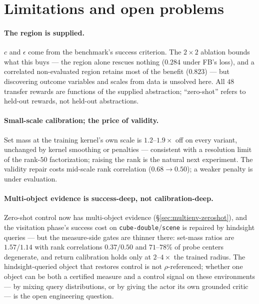 \documentclass{article}
\newcommand{\cube}{c}
\begin{document}
\section{Limitations and open problems}
\label{sec:limitations}

\paragraph{The region is supplied.}
$\cube$ and $\epsilon$ come from the benchmark's success criterion. The
$2\times2$ ablation bounds what this buys --- the region alone rescues nothing
($0.284$ under FB's loss), and a correlated non-evaluated region retains most
of the benefit ($0.823$) --- but discovering outcome variables and scales from
data is unsolved here. All $48$ transfer rewards are functions of the supplied
abstraction; ``zero-shot'' refers to held-out rewards, not held-out
abstractions.

\paragraph{Small-scale calibration; the price of validity.}
Set mass at the training kernel's own scale is $1.2$--$1.9\times$ off on every
variant, unchanged by kernel smoothing or penalties --- consistent with a
resolution limit of the rank-$50$ factorization; raising the rank is the
natural next experiment. The validity repair costs mid-scale rank correlation
($0.68\to0.50$); a weaker penalty is under evaluation.

\paragraph{Multi-object evidence is success-deep, not calibration-deep.}
Zero-shot control now has multi-object evidence
(\S\ref{sec:multienv-zeroshot}), and the visitation phase's success cost on
\texttt{cube-double}/\texttt{scene} is repaired by hindsight queries --- but
the measure-side gates are thinner there: set-mass ratios are $1.57/1.14$ with
rank correlations $0.37/0.50$ and $71$--$78\%$ of probe centers degenerate,
and return calibration holds only at $2$--$4\times$ the trained radius. The
hindsight-queried object that restores control is not $\rho$-referenced;
whether one object can be both a certified measure and a control signal on
these environments --- by mixing query distributions, or by giving the actor
its own grounded critic --- is the open engineering question.
\end{document}
